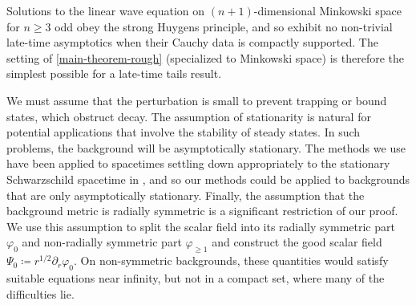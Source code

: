 \documentclass[10pt, reqno]{amsart}
\begin{document}
\begin{remark}
Solutions to the linear wave equation on \((n + 1)\)-dimensional Minkowski space
for \(n\ge 3\) odd obey the strong Huygens principle, and so exhibit no
non-trivial late-time asymptotics when their Cauchy data is compactly supported.
The setting of \cref{main-theorem-rough} (specialized to Minkowski space) is
therefore the simplest possible for a late-time tails result.
\end{remark}
\begin{remark}
We must assume that the perturbation is small to prevent trapping or bound
states, which obstruct decay. The assumption of stationarity is natural for
potential applications that involve the stability of steady states. In such
problems, the background will be asymptotically stationary. The methods we use
have been applied to spacetimes settling down appropriately to the stationary
Schwarzschild spacetime in \cite{gajic2025linearnonlinearlatetimetails}, and so
our methods could be applied to backgrounds that are only asymptotically
stationary. Finally, the assumption that the background metric is radially
symmetric is a significant restriction of our proof. We use this assumption to
split the scalar field into its radially symmetric part \(\varphi_0\) and
non-radially symmetric part \(\varphi_{\ge 1}\) and construct the good scalar
field \(\Psi_0\coloneqq{}r^{1/2}\partial_r\varphi_0\). On non-symmetric
backgrounds, these quantities would satisfy suitable equations near infinity,
but not in a compact set, where many of the difficulties lie.
\end{remark}
\end{document}

